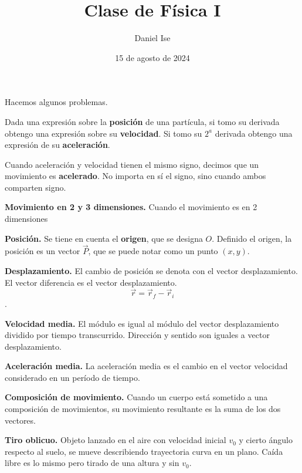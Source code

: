 \documentclass{article}
\title{Clase de Física I}
\author{Daniel Ise}
\date{15 de agosto de 2024}
\begin{document}
\maketitle

Hacemos algunos problemas.

Dada una expresión sobre la \textbf{posición} de una partícula, si tomo su
derivada obtengo una expresión sobre su \textbf{velocidad}. Si tomo su $2^a$
derivada obtengo una expresión de su \textbf{aceleración}.

Cuando aceleración y velocidad tienen el mismo signo, decimos que un movimiento
es \textbf{acelerado}. No importa en sí el signo, sino cuando ambos comparten
signo.

\textbf{Movimiento en 2 y 3 dimensiones.} Cuando el movimiento es en 2
dimensiones

\textbf{Posición.} Se tiene en cuenta el \textbf{origen}, que se designa $O$.
Definido el origen, la posición es un vector $\vec{P}$, que se puede notar
como un punto $(x,y)$.

\textbf{Desplazamiento.} El cambio de posición se denota con el vector
desplazamiento. El vector diferencia es el vector desplazamiento.
$$\vec{r} = \vec{r}_f - \vec{r}_i$$.

\textbf{Velocidad media.} El módulo es igual al módulo del vector desplazamiento
dividido por tiempo transcurrido. Dirección y sentido son iguales a vector
desplazamiento.

\textbf{Aceleración media.} La aceleración media es el cambio en el vector 
velocidad considerado en un período de tiempo. 

\textbf{Composición de movimiento.} Cuando un cuerpo está sometido a una 
composición de movimientos, su movimiento resultante es la suma de los dos 
vectores.

\textbf{Tiro oblicuo.} Objeto lanzado en el aire con velocidad inicial $v_0$ y 
cierto ángulo respecto al suelo, se mueve describiendo trayectoria 
curva en un plano. Caída libre es lo mismo pero tirado de una altura y sin 
$v_0$.
\end{document}
